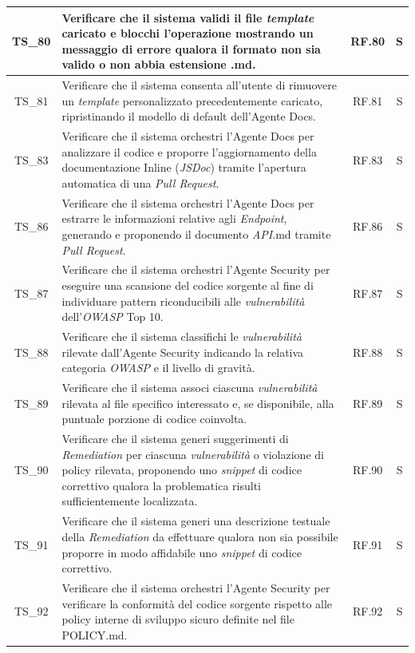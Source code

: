 \documentclass[12pt, a4paper]{article}
\newlength{\LargColVal} %
\begin{document}
\begin{xltabular}{\textwidth}{|c|X|C{\LargColVal}|C{\LargColVal}|}
    TS\_80 & Verificare che il sistema validi il file \textit{template} caricato e blocchi l'operazione mostrando un messaggio di errore qualora il formato non sia valido o non abbia estensione .md. & RF.80 & S \\ \hline
    TS\_81 & Verificare che il sistema consenta all'utente di rimuovere un \textit{template} personalizzato precedentemente caricato, ripristinando il modello di default dell'Agente Docs. & RF.81 & S \\ \hline
    TS\_83 & Verificare che il sistema orchestri l'Agente Docs per analizzare il codice e proporre l'aggiornamento della documentazione Inline (\textit{JSDoc}) tramite l'apertura automatica di una \textit{Pull Request}. & RF.83 & S \\ \hline
    TS\_86 & Verificare che il sistema orchestri l'Agente Docs per estrarre le informazioni relative agli \textit{Endpoint}, generando e proponendo il documento \textit{API}.md tramite \textit{Pull Request}. & RF.86 & S \\ \hline
    TS\_87 & Verificare che il sistema orchestri l'Agente Security per eseguire una scansione del codice sorgente al fine di individuare pattern riconducibili alle \textit{vulnerabilità} dell'\textit{OWASP} Top 10. & RF.87 & S \\ \hline
    TS\_88 & Verificare che il sistema classifichi le \textit{vulnerabilità} rilevate dall'Agente Security indicando la relativa categoria \textit{OWASP} e il livello di gravità. & RF.88 & S \\ \hline
    TS\_89 & Verificare che il sistema associ ciascuna \textit{vulnerabilità} rilevata al file specifico interessato e, se disponibile, alla puntuale porzione di codice coinvolta. & RF.89 & S \\ \hline
    TS\_90 & Verificare che il sistema generi suggerimenti di \textit{Remediation} per ciascuna \textit{vulnerabilità} o violazione di policy rilevata, proponendo uno \textit{snippet} di codice correttivo qualora la problematica risulti sufficientemente localizzata. & RF.90 & S \\ \hline
    TS\_91 & Verificare che il sistema generi una descrizione testuale della \textit{Remediation} da effettuare qualora non sia possibile proporre in modo affidabile uno \textit{snippet} di codice correttivo. & RF.91 & S \\ \hline
    TS\_92 & Verificare che il sistema orchestri l'Agente Security per verificare la conformità del codice sorgente rispetto alle policy interne di sviluppo sicuro definite nel file POLICY.md. & RF.92 & S \\ \hline

\end{xltabular}
\end{document}
